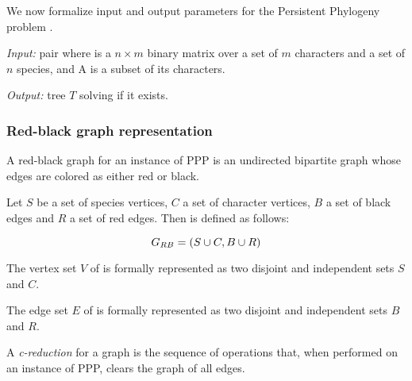 We now formalize input and output parameters for the Persistent Phylogeny problem \cite{PPPptime2016}.

\begin{definition}\label{def:ppp}
  \text{}

  \textit{Input:} pair \ma{} where \m{} is a $n \times m$ binary matrix over a set of $m$ characters and a set of $n$ species, and A is a subset of its characters.

  \textit{Output:} tree $T$ solving \m{} if it exists.
\end{definition}

\subsubsection{Red-black graph representation}\label{sssec:grb}

A red-black graph for an instance of PPP is an undirected bipartite graph whose edges are colored as either red or black.

\begin{definition}\label{def:grb}
  Let $S$ be a set of species vertices, $C$ a set of character vertices, $B$ a set of black edges and $R$ a set of red edges.
  Then \grb{} is defined as follows:

  \[ G_{RB}{} = (S \cup C, B \cup R) \]

  The vertex set $V$ of \grb{} is formally represented as two disjoint and independent sets $S$ and $C$.

  The edge set $E$ of \grb{} is formally represented as two disjoint and independent sets $B$ and $R$.
\end{definition}


A \emph{c-reduction} for a graph \grb{} is the sequence of operations that, when performed on an instance of PPP, clears the graph of all edges.

